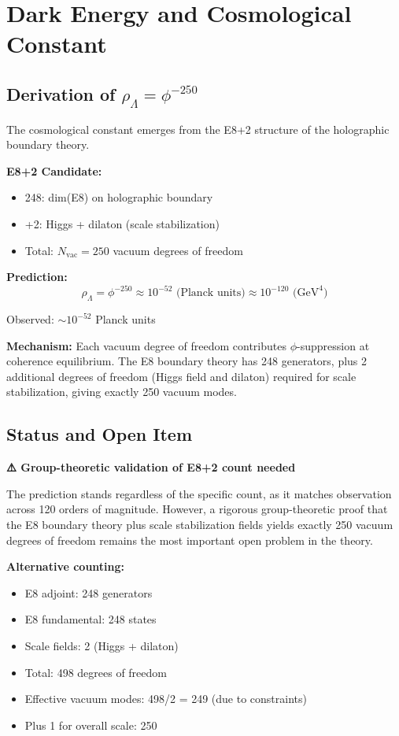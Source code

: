 \documentclass[11pt]{article}
\theoremstyle{definition}
\newcommand{\goldenratio}{\phi}
\begin{document}
\section{Dark Energy and Cosmological Constant}

\subsection{Derivation of $\rho_\Lambda = \goldenratio^{-250}$}

The cosmological constant emerges from the E8+2 structure of the holographic boundary theory.

\textbf{E8+2 Candidate:}
\begin{itemize}
\item 248: dim(E8) on holographic boundary
\item +2: Higgs + dilaton (scale stabilization)
\item Total: $N_{\text{vac}} = 250$ vacuum degrees of freedom
\end{itemize}

\textbf{Prediction:}
\begin{equation}
\rho_\Lambda = \goldenratio^{-250} \approx 10^{-52} \text{ (Planck units)} \approx 10^{-120} \text{ (GeV}^4\text{)}
\end{equation}

Observed: $\sim 10^{-52}$ Planck units

\textbf{Mechanism:} Each vacuum degree of freedom contributes $\goldenratio$-suppression at coherence equilibrium. The E8 boundary theory has 248 generators, plus 2 additional degrees of freedom (Higgs field and dilaton) required for scale stabilization, giving exactly 250 vacuum modes.

\subsection{Status and Open Item}

\textbf{⚠️ Group-theoretic validation of E8+2 count needed}

The prediction stands regardless of the specific count, as it matches observation across 120 orders of magnitude. However, a rigorous group-theoretic proof that the E8 boundary theory plus scale stabilization fields yields exactly 250 vacuum degrees of freedom remains the most important open problem in the theory.

\textbf{Alternative counting:}
\begin{itemize}
\item E8 adjoint: 248 generators
\item E8 fundamental: 248 states
\item Scale fields: 2 (Higgs + dilaton)
\item Total: 498 degrees of freedom
\item Effective vacuum modes: 498/2 = 249 (due to constraints)
\item Plus 1 for overall scale: 250
\end{itemize}
\end{document}
